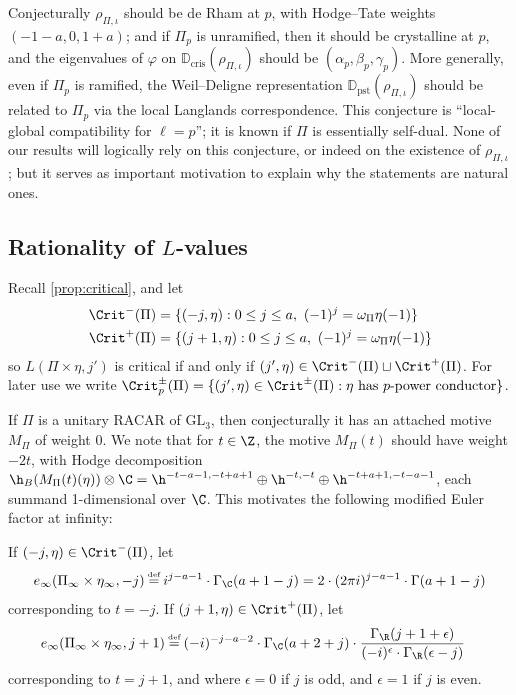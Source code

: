 \documentclass[10pt,reqno,a4paper]{amsart}
\newcommand{\GL}{\mathrm{GL}}
\begin{document}
Conjecturally $\rho_{\Pi, \iota}$ should be de Rham at $p$, with Hodge--Tate weights $(-1-a, 0, 1+a)$; and if $\Pi_p$ is unramified, then it should be crystalline at $p$, and the eigenvalues of $\varphi$ on $\mathbb{D}_{\mathrm{cris}}(\rho_{\Pi, \iota})$ should be $( \alpha_p, \beta_p, \gamma_p)$. More generally, even if $\Pi_p$ is ramified, the Weil--Deligne representation $\mathbb{D}_{\mathrm{pst}}(\rho_{\Pi, \iota})$ should be related to $\Pi_p$ via the local Langlands correspondence. This conjecture is ``local-global compatibility for $\ell = p$''; it is known if $\Pi$ is essentially self-dual. None of our results will logically rely on this conjecture, or indeed on the existence of $\rho_{\Pi, \iota}$; but it serves as important motivation to explain why the statements are natural ones.


\subsection{\texorpdfstring{Rationality of $L$-values}{Rationality of L-values}}
\label{sec:rationality}

Recall \cref{prop:critical}, and let
\begin{align*}
\Crit^-(\Pi) &= \{ (-j, \eta): 0 \le j \le a,\ (-1)^j = \omega_{\Pi}\eta(-1)\} \\
\Crit^+(\Pi) &= \{ (j+1, \eta): 0 \le j \le a,\ (-1)^j = \omega_{\Pi}\eta(-1)\}
\end{align*}
so $L(\Pi \times \eta, j')$ is critical if and only if $(j', \eta) \in \Crit^-(\Pi) \sqcup \Crit^+(\Pi)$. For later use we write $\Crit^{\pm}_p(\Pi) = \{ (j', \eta) \in \Crit^{\pm}(\Pi): \eta \text{ has $p$-power conductor}\}$.


If $\Pi$ is a unitary RACAR of $\GL_3$, then conjecturally it has an attached motive $M_\Pi$ of weight 0. %
We note that for $t \in \Z$, the motive $M_\Pi(t)$ should have weight $-2t$, with Hodge decomposition $\h_B(M_\Pi(t)(\eta))\otimes \C = \h^{-t-a-1,-t+a+1} \oplus \h^{-t,-t} \oplus \h^{-t+a+1,-t-a-1}$, each summand 1-dimensional over $\C$. This motivates the following modified Euler factor at infinity:

\begin{definition}\label{def:modified infinity}
If $(-j,\eta) \in \Crit^-(\Pi)$, let 
\[
e_\infty(\Pi_\infty \times \eta_\infty, -j) \defeq i^{j-a-1} \cdot \Gamma_{\C}(a+1-j) = 2\cdot (2\pi i)^{j-a-1} \cdot \Gamma(a+1-j)
\]
corresponding to $t = -j$. If $(j+1,\eta) \in \Crit^+(\Pi)$, let
\begin{align*}
	e_\infty(\Pi_\infty \times \eta_\infty,j+1) &\defeq  (-i)^{-j-a-2}\cdot \Gamma_{\C}(a+2+j)\cdot  \frac{\Gamma_{\R}(j+1+\epsilon)}{(-i)^\epsilon \cdot \Gamma_{\R}(\epsilon -j)}
\end{align*}
	corresponding to $t = j+1$, and where $\epsilon = 0$ if $j$ is odd, and $\epsilon = 1$ if $j$ is even.
\end{definition}
\end{document}
